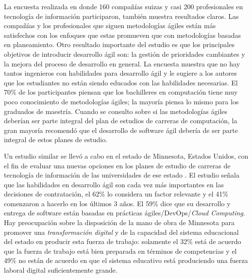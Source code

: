 \documentclass[journal]{IEEEtran}
\begin{document}
La encuesta realizada en \cite{kropp-meier-1} donde 160 compañías suizas y casi 200 profesionales en tecnología de información participaron, también muestra resultados claros. Las compañías y los profesionales que siguen metodologías ágiles están más satisfechos con los enfoques que estas promueven que con metodologías basadas en planeamiento. Otro resultado importante del estudio es que los principales objetivos de introducir desarrollo ágil son: la gestión de prioridades cambiantes y la mejora del proceso de desarrollo en general. La encuesta muestra que no hay tantos ingenieros con habilidades para desarrollo ágil y le sugiere a los autores que los estudiantes no están siendo educados con las habilidades necesarias. El 70\% de los participantes piensan que los bachilleres en computación tiene muy poco conocimiento de metodologías ágiles; la mayoría piensa lo mismo para los graduados de maestría. Cuando se consulto sobre si las metodologías ágiles deberían ser parte integral del plan de estudios de carreras de computación, la gran mayoría recomendó que el desarrollo de software ágil debería de ser parte integral de estos planes de estudio.

Un estudio similar se llevó a cabo en el estado de Minnesota, Estados Unidos, con el fin de evaluar una nuevas opciones en los planes de estudio de carreras de tecnología de información de las universidades de ese estado \cite{advance-it}. El estudio señala que las habilidades en desarrollo ágil son cada vez más importantes en las decisiones de contratación, el 62\% lo considera un factor relevante y el 41\% comenzaron a hacerlo en los últimos 3 años. El 59\% dice que su desarrollo y entrega de software están basadas en prácticas ágiles/DevOps/\emph{Cloud Computing}. Hay preocupación sobre la disposición de la mano de obra de Minnesota para promover una \emph{transformación digital} y de la capacidad del sistema educacional del estado en producir esta fuerza de trabajo: solamente el 32\% está de acuerdo que la fuerza de trabajo está bien preparada en términos de competencias y el 49\% no están de acuerdo en que el sistema educativo está produciendo una fuerza laboral digital suficientemente grande.
\end{document}
